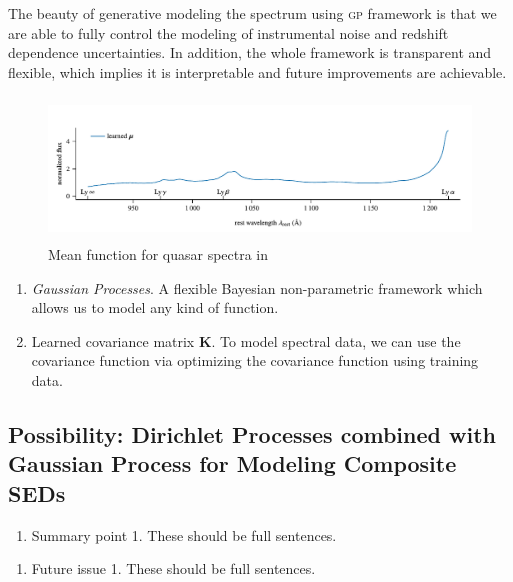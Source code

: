 \documentclass{ar-1col}
\begin{document}
 The beauty of generative modeling the spectrum using \textsc{gp} framework is that we are able to fully control the modeling of instrumental noise and redshift dependence uncertainties. 
 In addition, the whole framework is transparent and flexible, which implies it is interpretable and future improvements are achievable. 


\begin{figure}
    \includegraphics[width=5in, height=1.5in]{images/mean_function.pdf}
    \caption{Mean function for quasar spectra in \citet{Garnett17}}
    \label{fig:mean_function}
\end{figure}


\begin{summary}
    \begin{enumerate}
    \item \textit{Gaussian Processes}. A flexible Bayesian non-parametric framework which allows us to model any kind of function.
    \item Learned covariance matrix $\mathbf{K}$. To model spectral data, we can use the covariance function via optimizing the covariance function using training data.
    \end{enumerate}
\end{summary}
    

\subsection{Possibility: Dirichlet Processes combined with Gaussian Process for Modeling Composite SEDs}


\begin{summary}
\begin{enumerate}
\item Summary point 1. These should be full sentences.
\end{enumerate}
\end{summary}

\begin{issues}
\begin{enumerate}
\item Future issue 1. These should be full sentences.
\end{enumerate}
\end{issues}
\end{document}
